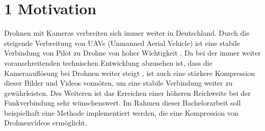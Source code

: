 \documentclass[a4paper,11pt,pdftex, parskip]{scrreprt}
\begin{document}
\maketitle

\section*{1 Motivation}
Drohnen mit Kameras verbreiten sich immer weiter in Deutschland. Durch die steigende Verbreitung von UAVs (Unmanned Aerial Vehicle) ist eine stabile Verbindung von Pilot zu Drohne von hoher Wichtigkeit \citep{Nehring2021}. \newline
Da bei der immer weiter voranschreitenden technischen Entwicklung abzusehen ist, dass die Kameraauflösung bei Drohnen weiter steigt \citep{futuretech2017}, ist auch eine stärkere Kompression dieser Bilder und Videos vonnöten, um eine stabile Verbindung weiter zu gewährleisten. Des Weiteren ist das Erreichen einer höheren Reichweite bei der Funkverbindung sehr wünschenswert. \newline
Im Rahmen dieser Bachelorarbeit soll beispielhaft eine Methode implementiert werden, die eine Kompression von Drohnenvideos ermöglicht.
\end{document}
